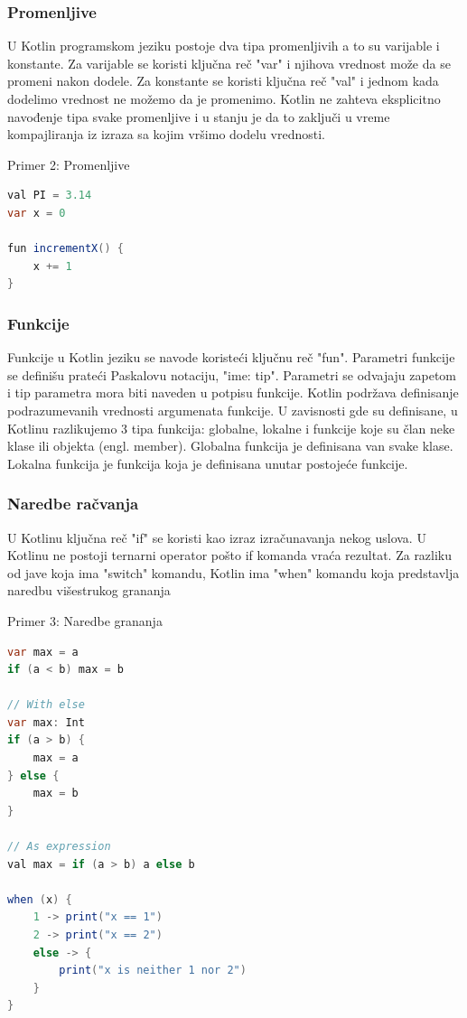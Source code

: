 \documentclass[12pt,oneside]{memoir}
\begin{document}
\subsubsection{Promenljive}
U Kotlin programskom jeziku postoje dva tipa promenljivih a to su varijable i konstante. Za varijable se koristi ključna reč "var" i njihova vrednost može da se promeni nakon dodele. Za konstante se koristi ključna reč "val" i jednom kada dodelimo vrednost ne možemo da je promenimo. Kotlin ne zahteva eksplicitno navođenje tipa svake promenljive i u stanju je da to zaključi u vreme kompajliranja iz izraza sa kojim vršimo dodelu vrednosti.

\begin{center} Primer 2: Promenljive\end{center}
\begin{lstlisting}[language=Java]
val PI = 3.14
var x = 0
 
fun incrementX() { 
    x += 1 
}
\end{lstlisting}
 
\subsubsection{Funkcije}
Funkcije u Kotlin jeziku se navode koristeći ključnu reč "fun". Parametri funkcije se definišu prateći Paskalovu notaciju, "ime: tip". Parametri se odvajaju zapetom i tip parametra mora biti naveden u potpisu funkcije. Kotlin podržava definisanje podrazumevanih vrednosti argumenata funkcije. U zavisnosti gde su definisane, u Kotlinu razlikujemo 3 tipa funkcija: globalne, lokalne i funkcije koje su član neke klase ili objekta (engl. member). Globalna funkcija je definisana van svake klase. Lokalna funkcija je funkcija koja je definisana unutar postojeće funkcije.
 
\subsubsection{Naredbe račvanja}
 
U Kotlinu ključna reč "if" se koristi kao izraz izračunavanja nekog uslova. U Kotlinu ne postoji ternarni operator pošto if komanda vraća rezultat. Za razliku od jave koja ima "switch" komandu, Kotlin ima "when" komandu koja predstavlja naredbu višestrukog grananja

\begin{center} Primer 3: Naredbe grananja\end{center}
\begin{lstlisting}[language=Java]
var max = a
if (a < b) max = b
 
// With else
var max: Int
if (a > b) {
    max = a
} else {
    max = b
}
 
// As expression
val max = if (a > b) a else b
 
when (x) {
    1 -> print("x == 1")
    2 -> print("x == 2")
    else -> {
        print("x is neither 1 nor 2")
    }
}
\end{lstlisting}
 
\end{document}
